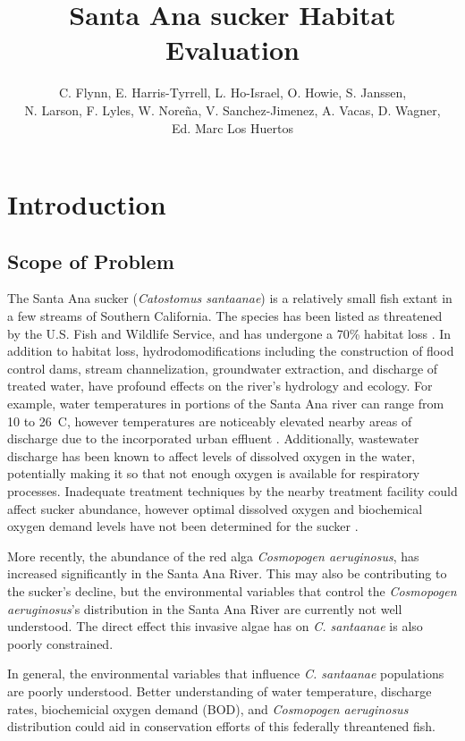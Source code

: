 \documentclass{article}
\title{Santa Ana sucker Habitat Evaluation}
\author{C. Flynn, E. Harris-Tyrrell, L. Ho-Israel, O. Howie, S. Janssen, \\N. Larson, F. Lyles, W. Nore\~na, V. Sanchez-Jimenez, A. Vacas, D. Wagner,\\ Ed. Marc Los Huertos}
\begin{document}


\maketitle

\newpage
\tableofcontents
\newpage

\section{Introduction}

\subsection{Scope of Problem}

The Santa Ana sucker (\emph{Catostomus santaanae}) is a relatively small fish extant in a few streams of Southern California. The species has been listed as threatened by the U.S. Fish and Wildlife Service, and has undergone a 70\% habitat loss \citep{obrien2011status, usfishandwildlifeservice14}. In addition to habitat loss, hydrodomodifications including the construction of flood control dams, stream channelization, groundwater extraction, and discharge of treated water, have profound effects on the river's hydrology and ecology. For example, water temperatures in portions of the Santa Ana river can range from 10 to 26\textdegree~C, however temperatures are noticeably elevated nearby areas of discharge due to the incorporated urban effluent \citep{greenfield70}. Additionally, wastewater discharge has been known to affect levels of dissolved oxygen in the water, potentially making it so that not enough oxygen is available for respiratory processes. Inadequate treatment techniques by the nearby treatment facility could affect sucker abundance, however optimal dissolved oxygen and biochemical oxygen demand levels have not been determined for the sucker \citep{baskerville2012recovery}. 

More recently, the abundance of the red alga \emph{Cosmopogen aeruginosus}, has increased significantly in the Santa Ana River. This may also be contributing to the sucker's decline, but the environmental variables that control the \emph{Cosmopogen aeruginosus}'s distribution in the Santa Ana River are currently not well understood. The direct effect this invasive algae has on \emph{C. santaanae} is also poorly constrained. 

In general, the environmental variables that influence \emph{C. santaanae} populations are poorly understood. Better understanding of water temperature, discharge rates, biochemicial oxygen demand (BOD), and \emph{Cosmopogen aeruginosus} distribution could aid in conservation efforts of this federally threantened fish. 
\end{document}
